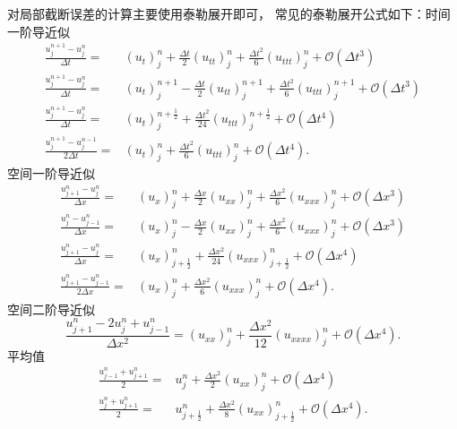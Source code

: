 对局部截断误差的计算主要使用泰勒展开即可，
常见的泰勒展开公式如下：时间一阶导近似
\begin{align*}
    \frac{u_j^{n+1}-u_j^n}{\Delta t} ={}      & (u_t)_j^n + \frac{\Delta t}2 (u_{tt})_j^n
    + \frac{\Delta t^2}6 (u_{ttt})_j^n + \mathcal{O}(\Delta t^3)                                                                              \\
    \frac{u_j^{n+1}-u_j^n}{\Delta t} ={}      & (u_t)_j^{n+1} - \frac{\Delta t}2 (u_{tt})_j^{n+1}
    + \frac{\Delta t^2}6 (u_{ttt})_j^{n+1} + \mathcal{O}(\Delta t^3)                                                                          \\
    \frac{u_j^{n+1}-u_j^n}{\Delta t} ={}      & (u_t)_j^{n+\frac12} + \frac{\Delta t^2}{24} (u_{ttt})_j^{n+\frac12} + \mathcal{O}(\Delta t^4) \\
    \frac{u_j^{n+1}-u_j^{n-1}}{2\Delta t} ={} & (u_t)_j^{n} + \frac{\Delta t^2}{6} (u_{ttt})_j^{n} + \mathcal{O}(\Delta t^4).
\end{align*}
空间一阶导近似
\begin{align*}
    \frac{u_{j+1}^{n}-u_j^n}{\Delta x} ={}        & (u_x)_j^n + \frac{\Delta x}2 (u_{xx})_j^n
    + \frac{\Delta x^2}6 (u_{xxx})_j^n + \mathcal{O}(\Delta x^3)                                                                                    \\
    \frac{u_{j}^{n}-u_{j-1}^n}{\Delta x} ={}      & (u_x)_j^{n} - \frac{\Delta x}2 (u_{xx})_j^{n}
    + \frac{\Delta x^2}6 (u_{xxx})_j^{n} + \mathcal{O}(\Delta x^3)                                                                                  \\
    \frac{u_{j+1}^{n}-u_j^n}{\Delta x} ={}        & (u_x)_{j+\frac12}^{n} + \frac{\Delta x^2}{24} (u_{xxx})_{j+\frac12}^n + \mathcal{O}(\Delta x^4) \\
    \frac{u_{j+1}^{n}-u_{j-1}^{n}}{2\Delta x} ={} & (u_x)_j^{n} + \frac{\Delta x^2}{6} (u_{xxx})_j^{n} + \mathcal{O}(\Delta x^4).
\end{align*}
空间二阶导近似
\[
    \frac{u_{j+1}^{n} - 2 u_j^n + u_{j-1}^n}{\Delta x^2} ={}
    (u_{xx})_{j}^n + \frac{\Delta x^2}{12} (u_{xxxx})_j^n + \mathcal{O}(\Delta x^4).
\]
平均值
\begin{align*}
    \frac{u_{j-1}^{n} + u_{j+1}^n}{2} ={} & u_j^n + \frac{\Delta x^2}2 (u_{xx})_j^n + \mathcal{O}(\Delta x^4)                     \\
    \frac{u_{j}^{n} + u_{j+1}^n}{2} ={}   & u_{j+\frac12}^n + \frac{\Delta x^2}8 (u_{xx})_{j+\frac12}^n + \mathcal{O}(\Delta x^4).
\end{align*}

